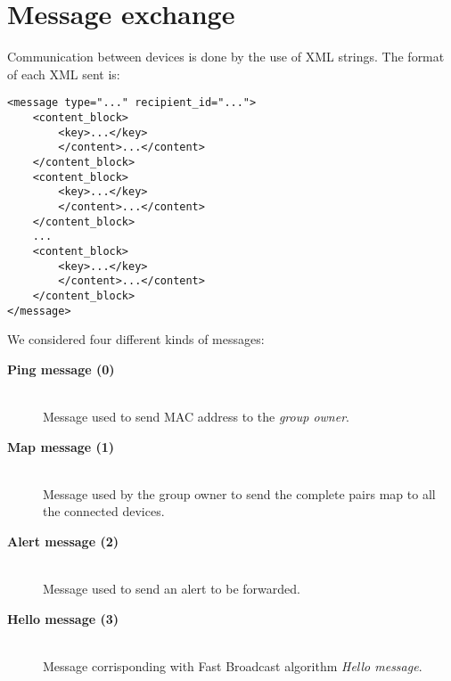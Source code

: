 \section{Message exchange}

Communication between devices is done by the use of XML strings. The format of each XML sent is:
\begin{verbatim}
<message type="..." recipient_id="...">
    <content_block>
        <key>...</key>
        </content>...</content>
    </content_block>
    <content_block>
        <key>...</key>
        </content>...</content>
    </content_block>
    ...
    <content_block>
        <key>...</key>
        </content>...</content>
    </content_block>
</message>
\end{verbatim}
We considered four different kinds of messages:
	\begin{description}
		\item[\textbf{Ping message (0)}] \hfill \\
		Message used to send MAC address to the \textit{group owner}.
		\item[\textbf{Map message (1)}] \hfill \\
		Message used by the group owner to send the complete  pairs map to all the connected devices.
		\item[\textbf{Alert message (2)}] \hfill \\
		Message used to send an alert to be forwarded.
		\item[\textbf{Hello message (3)}] \hfill \\
		Message corrisponding with Fast Broadcast algorithm \textit{Hello message}.
	\end{description}
